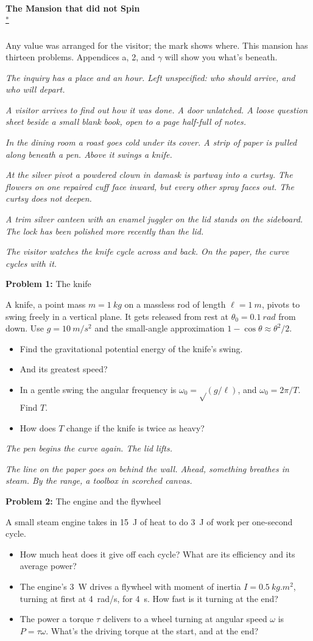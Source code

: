 \documentclass[11pt]{article}
\newcommand{\room}[1]{\par\bigskip{\large\bfseries #1}\par\nopagebreak\smallskip}
\newcommand{\scene}[1]{\par{\itshape #1}\par}
\newcommand{\problem}[2]{\par\medskip\textbf{Problem #1:} #2\par\nopagebreak}
\newenvironment{parts}{\begin{itemize}[leftmargin=3.4em,labelwidth=2.8em,labelsep=0.6em,align=left,itemsep=3pt,topsep=4pt]}{\end{itemize}}
\newcommand{\pt}[1]{\item[\textbf{#1}]}
\newcommand{\rt}{\text{√}}  %
\begin{document}
\thispagestyle{plain}
\begin{center}
{\LARGE\bfseries The Mansion that did not Spin}\\[4pt]
{\small \BuildStamp\textsuperscript{\hyperlink{release-note}{*}}}
\end{center}

Any value\textsuperscript{\dag} was arranged for the visitor; the mark shows where. This mansion has thirteen problems. Appendices a, 2, and $\gamma$ will show you what's beneath.

\room{The way in}
\scene{The inquiry has a place and an hour. Left unspecified: who should arrive, and who will depart.}
\scene{A visitor arrives to find out how it was done. A door unlatched. A loose question sheet beside a small blank book, open to a page half-full of notes.}
\scene{In the dining room a roast goes cold under its cover. A strip of paper is pulled along beneath a pen. Above it swings a knife.}
\scene{At the silver pivot a powdered clown in damask is partway into a curtsy. The flowers on one repaired cuff face inward, but every other spray faces out. The curtsy does not deepen.}
\scene{A trim silver canteen with an enamel juggler on the lid stands on the sideboard. The lock has been polished more recently than the lid.}
\scene{The visitor watches the knife cycle across and back. On the paper, the curve cycles with it.}

\room{Dining room}
\problem{1}{The knife}
A knife, a point mass $m = \SI{1}{kg}$ on a massless rod of length $\ell = \SI{1}{m}$, pivots to swing freely in a vertical plane. It gets released from rest at $\theta_0 = \SI{0.1}{rad}$ from down. Use $g = \SI{10}{m/s^2}$ and the small-angle approximation $1 - \cos\theta \approx \theta^2/2$.
\begin{parts}
\pt{1-a} Find the gravitational potential energy of the knife's swing.
\pt{1-b} And its greatest speed?
\pt{1-c} In a gentle swing the angular frequency is $\omega_0 = \rt(g/\ell)$, and $\omega_0 = 2\pi/T$. Find $T$.
\pt{1-d} How does $T$ change if the knife is twice as heavy?
\end{parts}
\scene{The pen begins the curve again. The lid lifts.}

\clearpage
\room{Kitchen}
\scene{The line on the paper goes on behind the wall. Ahead, something breathes in steam. By the range, a toolbox in scorched canvas.}
\problem{2}{The engine and the flywheel}
A small steam engine takes in \SI{15}{J} of heat to do \SI{3}{J} of work per one-second cycle.
\begin{parts}
\pt{2-a} How much heat does it give off each cycle? What are its efficiency and its average power?
\pt{2-b} The engine's \SI{3}{W} drives a flywheel with moment of inertia $I = \SI{0.5}{kg.m^2}$, turning at first at \SI{4}{rad/s}, for \SI{4}{s}. How fast is it turning at the end?
\pt{2-c} The power a torque $\tau$ delivers to a wheel turning at angular speed $\omega$ is $P = \tau\omega$. What's the driving torque at the start, and at the end?
\end{parts}
\end{document}

